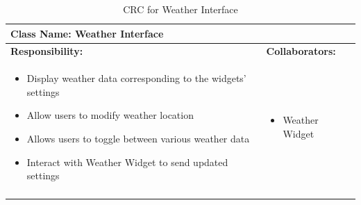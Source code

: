 \documentclass[]{article}
\begin{document}
\begin{longtable}{| p{} | p{} |}
	\hline
	\multicolumn{2}{|l|}{\textbf{Class Name: Weather Interface}} \\
	\hline
	\textbf{Responsibility:} & \textbf{Collaborators:} \\
	\hline
	\begin{itemize}
		\item Display weather data corresponding to the widgets' settings
		\item Allow users to modify weather location
		\item Allows users to toggle between various weather data
		\item Interact with Weather Widget to send updated settings
    \end{itemize} & 
	\begin{itemize}
		\item Weather Widget
	\end{itemize} \\
	\hline
	\caption{CRC for Weather Interface}
\end{longtable}
\end{document}
